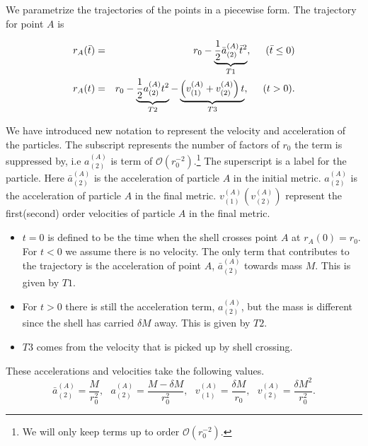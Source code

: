 \documentclass[aps,showpacs,onecolumn,floats,prd,superscriptaddress,nofootinbib]{revtex4-1}
\begin{document}
We parametrize the trajectories of the points in a piecewise form. 
The trajectory for point $A$ is


\begin{eqnarray}
	r_A(\bar{t}) & = & r_0 - \underbrace{\frac{1}{2} \bar{a}_{(2)}^{(A)} \bar{t}^2}_{T1}, \hspace{5mm} (\bar{t} \leq 0)	\nonumber	\\
	r_A(t) & = & r_0 - \underbrace{\frac{1}{2} a^{(A)}_{(2)} t^2}_{T2} - \underbrace{\left(v^{(A)}_{(1)} + v^{(A)}_{(2)} \right)t}_{T3},  \hspace{5mm} (t>0)  \label{rA}.
\end{eqnarray}

We have introduced new notation to represent the velocity and acceleration of the particles. The subscript represents the number of factors of $r_0$ the term is suppressed by, i.e $a^{(A)}_{(2)}$ is term of $\mathcal{O}(r_0^{-2})$.\footnote{We will only keep terms up to order $\mathcal{O}(r_0^{-2})$.} The superscript is a label for the particle. Here $\bar{a}^{(A)}_{(2)}$ is the acceleration of particle $A$ in the initial metric. $a^{(A)}_{(2)}$ is the acceleration of particle $A$ in the final metric. $v^{(A)}_{(1)}(v^{(A)}_{(2)})$ represent the first(second) order velocities of particle $A$ in the final metric. 
\begin{itemize}
\item $t=0$ is defined to be the time when the shell crosses point $A$ at $r_A(0) = r_0$. For $t<0$ we assume there is no velocity. The only term that contributes to the trajectory is the acceleration of point $A$, $\bar{a}^{(A)}_{(2)}$ towards mass $M$. This is given by $T1$.
\item For $t>0$ there is still the acceleration term, $a^{(A)}_{(2)}$, but the mass is different since the shell has carried $\delta M$ away. This is given by $T2$.
\item $T3$ comes from the velocity that is picked up by shell crossing. 
\end{itemize}
These accelerations and velocities take the following values.
\begin{equation}
	\bar{a}^{(A)}_{(2)} = \frac{M}{r_0^2}, \ \ \ 
	a^{(A)}_{(2)} = \frac{M - \delta M}{r_0^2}, \ \ \ 
	v^{(A)}_{(1)} = \frac{\delta M}{r_0}, \ \ \ 
	v^{(A)}_{(2)} = \frac{\delta M^2}{r_0^2}.
\end{equation} 
\end{document}
